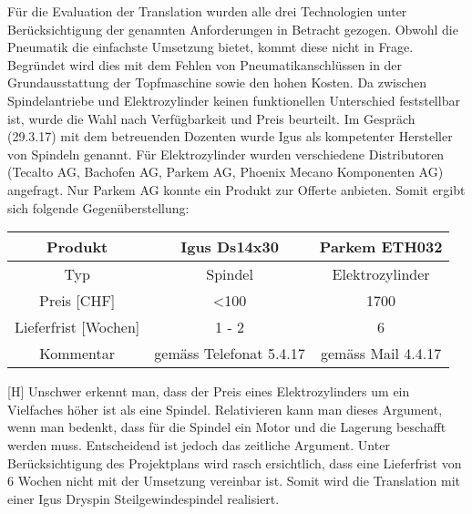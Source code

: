 Für die Evaluation der Translation wurden alle drei Technologien unter Berücksichtigung der genannten Anforderungen in Betracht gezogen. Obwohl die Pneumatik die einfachste Umsetzung bietet, kommt diese nicht in Frage. Begründet wird dies mit dem Fehlen von Pneumatikanschlüssen in der Grundausstattung der Topfmaschine sowie den hohen Kosten.
\newline
Da zwischen Spindelantriebe und Elektrozylinder keinen funktionellen Unterschied feststellbar ist, wurde die Wahl nach Verfügbarkeit und Preis beurteilt. Im Gespräch (29.3.17) mit dem betreuenden Dozenten wurde Igus als kompetenter Hersteller von Spindeln genannt. Für Elektrozylinder wurden verschiedene Distributoren (Tecalto AG, Bachofen AG, Parkem AG, Phoenix Mecano Komponenten AG) angefragt. Nur Parkem AG konnte ein Produkt zur Offerte anbieten. Somit ergibt sich folgende Gegenüberstellung:
\begin{table}[H]
\begin{tabular}{|c|c|c|}
	\hline 
	Produkt & Igus Ds14x30 & Parkem ETH032  \\ 
	\hline 
	Typ & Spindel & Elektrozylinder \\ 
	\hline 
	Preis [CHF] & <100  & 1700    \\ 
	\hline 
	Lieferfrist [Wochen] &1 - 2  &6 \\ 
	\hline 
	Kommentar & gemäss Telefonat 5.4.17 & gemäss Mail 4.4.17 \\ 
	\hline 
\end{tabular}
	\vspace{0.2cm}
\end{table}[H]	 
Unschwer erkennt man, dass der Preis eines Elektrozylinders um ein Vielfaches höher ist als eine Spindel. Relativieren kann man dieses Argument, wenn man bedenkt, dass für die Spindel ein Motor und die Lagerung beschafft werden muss. Entscheidend ist jedoch das zeitliche Argument. Unter Berücksichtigung des Projektplans wird rasch ersichtlich, dass eine Lieferfrist von 6 Wochen nicht mit der Umsetzung vereinbar ist. Somit wird die Translation mit einer Igus Dryspin Steilgewindespindel realisiert.


